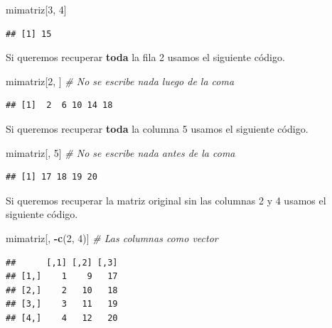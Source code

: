 \documentclass[10pt,]{krantz}
\makeatletter
\newenvironment{Shaded}{\begin{snugshade}}{\end{snugshade}}
\newcommand{\KeywordTok}[1]{\textcolor[rgb]{0.13,0.29,0.53}{\textbf{#1}}}
\newcommand{\DecValTok}[1]{\textcolor[rgb]{0.00,0.00,0.81}{#1}}
\newcommand{\CommentTok}[1]{\textcolor[rgb]{0.56,0.35,0.01}{\textit{#1}}}
\newcommand{\OperatorTok}[1]{\textcolor[rgb]{0.81,0.36,0.00}{\textbf{#1}}}
\newcommand{\NormalTok}[1]{#1}
\newenvironment{kframe}{%
\medskip{}
\setlength{\fboxsep}{.8em}
 \def\at@end@of@kframe{}%
 \ifinner\ifhmode%
  \def\at@end@of@kframe{\end{minipage}}%
  \begin{minipage}{\columnwidth}%
 \fi\fi%
 \def\FrameCommand##1{\hskip\@totalleftmargin \hskip-\fboxsep
 \colorbox{shadecolor}{##1}\hskip-\fboxsep
     \hskip-\linewidth \hskip-\@totalleftmargin \hskip\columnwidth}%
 \MakeFramed {\advance\hsize-\width
   \@totalleftmargin\z@ \linewidth\hsize
   \@setminipage}}%
 {\par\unskip\endMakeFramed%
 \at@end@of@kframe}
\renewenvironment{Shaded}{\begin{kframe}}{\end{kframe}}
\makeatother
\begin{document}
\begin{Shaded}
\begin{Highlighting}[]
\NormalTok{mimatriz[}\DecValTok{3}\NormalTok{, }\DecValTok{4}\NormalTok{]}
\end{Highlighting}
\end{Shaded}

\begin{verbatim}
## [1] 15
\end{verbatim}

Si queremos recuperar \textbf{toda} la fila 2 usamos el siguiente
código.

\begin{Shaded}
\begin{Highlighting}[]
\NormalTok{mimatriz[}\DecValTok{2}\NormalTok{, ]  }\CommentTok{# No se escribe nada luego de la coma}
\end{Highlighting}
\end{Shaded}

\begin{verbatim}
## [1]  2  6 10 14 18
\end{verbatim}

Si queremos recuperar \textbf{toda} la columna 5 usamos el siguiente
código.

\begin{Shaded}
\begin{Highlighting}[]
\NormalTok{mimatriz[, }\DecValTok{5}\NormalTok{]  }\CommentTok{# No se escribe nada antes de la coma}
\end{Highlighting}
\end{Shaded}

\begin{verbatim}
## [1] 17 18 19 20
\end{verbatim}

Si queremos recuperar la matriz original sin las columnas 2 y 4 usamos
el siguiente código.

\begin{Shaded}
\begin{Highlighting}[]
\NormalTok{mimatriz[, }\OperatorTok{-}\KeywordTok{c}\NormalTok{(}\DecValTok{2}\NormalTok{, }\DecValTok{4}\NormalTok{)]  }\CommentTok{# Las columnas como vector}
\end{Highlighting}
\end{Shaded}

\begin{verbatim}
##      [,1] [,2] [,3]
## [1,]    1    9   17
## [2,]    2   10   18
## [3,]    3   11   19
## [4,]    4   12   20
\end{verbatim}
\end{document}
